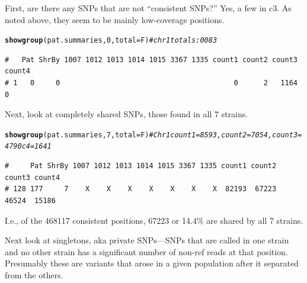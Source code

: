 \documentclass{article}\usepackage[]{graphicx}\usepackage[]{color}
\makeatletter
\newcommand{\hlnum}[1]{\textcolor[rgb]{0.686,0.059,0.569}{#1}}%
\newcommand{\hlcom}[1]{\textcolor[rgb]{0.678,0.584,0.686}{\textit{#1}}}%
\newcommand{\hlstd}[1]{\textcolor[rgb]{0.345,0.345,0.345}{#1}}%
\newcommand{\hlkwc}[1]{\textcolor[rgb]{0.333,0.667,0.333}{#1}}%
\newcommand{\hlkwd}[1]{\textcolor[rgb]{0.737,0.353,0.396}{\textbf{#1}}}%
\newenvironment{kframe}{%
 \def\at@end@of@kframe{}%
 \ifinner\ifhmode%
  \def\at@end@of@kframe{\end{minipage}}%
  \begin{minipage}{\columnwidth}%
 \fi\fi%
 \def\FrameCommand##1{\hskip\@totalleftmargin \hskip-\fboxsep
 \colorbox{shadecolor}{##1}\hskip-\fboxsep
     \hskip-\linewidth \hskip-\@totalleftmargin \hskip\columnwidth}%
 \MakeFramed {\advance\hsize-\width
   \@totalleftmargin\z@ \linewidth\hsize
   \@setminipage}}%
 {\par\unskip\endMakeFramed%
 \at@end@of@kframe}
\newenvironment{knitrout}{}{} %
\makeatother
\begin{document}
First, are there any SNPs that are not ``consistent SNPs?''  Yes, a few in c3.  As noted above, they seem to be mainly
low-coverage positions.

\begin{knitrout}\footnotesize
{}\color{fgcolor}\begin{kframe}
\begin{alltt}
\hlkwd{showgroup}\hlstd{(pat.summaries,}\hlnum{0}\hlstd{,}\hlkwc{total}\hlstd{=F)}  \hlcom{# chr1 totals: 0 0 83}
\end{alltt}
\begin{verbatim}
#   Pat ShrBy 1007 1012 1013 1014 1015 3367 1335 count1 count2 count3 count4
# 1   0     0                                         0      2   1164      0
\end{verbatim}
\end{kframe}
\end{knitrout}

Next, look at completely shared SNPs, those found in all 7 strains.

\begin{knitrout}\footnotesize
{}\color{fgcolor}\begin{kframe}
\begin{alltt}
\hlkwd{showgroup}\hlstd{(pat.summaries,}\hlnum{7}\hlstd{,}\hlkwc{total}\hlstd{=F)} \hlcom{# Chr1 count1 = 8593, count2 = 7054, count3 = 4790 c4=1641}
\end{alltt}
\begin{verbatim}
#     Pat ShrBy 1007 1012 1013 1014 1015 3367 1335 count1 count2 count3 count4
# 128 177     7    X    X    X    X    X    X    X  82193  67223  46524  15186
\end{verbatim}
\end{kframe}
\end{knitrout}

I.e., of the
  468117
consistent positions,
  67223
or
  14.4\%
are shared by all 7 strains.

Next look at singletons, aka private SNPs---SNPs that are called in one strain and no other strain has a significant
number of non-ref reads at that position. Presumably these are variants that arose in a given population after it
separated from the others.
\end{document}
